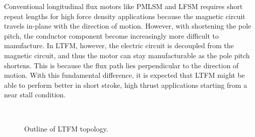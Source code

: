         
        Conventional longitudinal flux motors like \acs{PMLSM} and \acs{LFSM} requires short repeat lengths for high force density applications because the magnetic circuit travels in-plane with the direction of motion. However, with shortening the pole pitch, the conductor component become increasingly more difficult to manufacture. In \acf{LTFM}, however, the electric circuit is decoupled from the magnetic circuit, and thus the motor can stay manufacturable as the pole pitch shortens. This is because the flux path lies perpendicular to the direction of motion. With this fundamental difference, it is expected that \acs{LTFM} might be able to perform better in short stroke, high thrust applications starting from a near stall condition. 
        
        
        \begin{figure}[!ht]
            \centering
            \\
            \caption{Outline of \acs{LTFM} topology.}
            \label{fig:chapter/rsm/LTFM/different LTFM arrangement}
        \end{figure}

